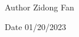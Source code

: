 \begin{DoxyAuthor}{Author}
Zidong Fan 
\end{DoxyAuthor}
\begin{DoxyDate}{Date}
01/20/2023 
\end{DoxyDate}

